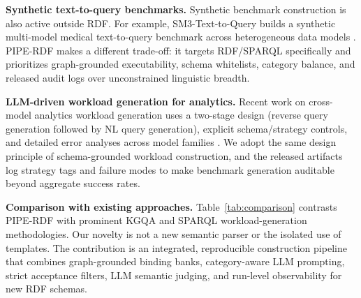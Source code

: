 \documentclass[11pt]{article}
\begin{document}
\textbf{Synthetic text-to-query benchmarks.} Synthetic benchmark construction is also active outside RDF. For example, SM3-Text-to-Query builds a synthetic multi-model medical text-to-query benchmark across heterogeneous data models \citep{furst2024sm3}. PIPE-RDF makes a different trade-off: it targets RDF/SPARQL specifically and prioritizes graph-grounded executability, schema whitelists, category balance, and released audit logs over unconstrained linguistic breadth.

\textbf{LLM-driven workload generation for analytics.} Recent work on cross-model analytics workload generation uses a two-stage design (reverse query generation followed by NL query generation), explicit schema/strategy controls, and detailed error analyses across model families \citep{zheng2024crossmodel}. We adopt the same design principle of schema-grounded workload construction, and the released artifacts log strategy tags and failure modes to make benchmark generation auditable beyond aggregate success rates.

\textbf{Comparison with existing approaches.} Table~\ref{tab:comparison} contrasts PIPE-RDF with prominent KGQA and SPARQL workload-generation methodologies. Our novelty is not a new semantic parser or the isolated use of templates. The contribution is an integrated, reproducible construction pipeline that combines graph-grounded binding banks, category-aware LLM prompting, strict acceptance filters, LLM semantic judging, and run-level observability for new RDF schemas.

\begin{table}[t]
  \centering
  \small
	  \caption{Comparison of PIPE-RDF with existing KGQA datasets and RDF workload-generation approaches. PIPE-RDF targets schema-specific NL--SPARQL benchmark construction with both graph-grounded generation and accepted-record auditing. ``Partial'' denotes support that is limited to fixed released benchmarks or does not directly handle user-provided schemas.}
  \label{tab:comparison}
\end{table}
\end{document}
